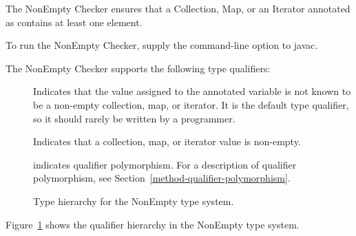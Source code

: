 \htmlhr
{}

The NonEmpty Checker ensures that a Collection, Map, or an Iterator annotated as
 contains at least one element.

To run the NonEmpty Checker, supply the
command-line option to javac.

The NonEmpty Checker supports the following type qualifiers:
\begin{description}

    \item[]
    Indicates that the value assigned to the annotated variable is not known to be a non-empty
    collection, map, or iterator. It is the default type
    qualifier, so it should rarely be written by a programmer.

    \item[]
    Indicates that a collection, map, or iterator value is non-empty.

    \item[]
    indicates qualifier polymorphism.
    For a description of qualifier polymorphism, see
    Section~\ref{method-qualifier-polymorphism}.

\end{description}

\begin{figure}
    \caption{Type hierarchy for the NonEmpty type system.}
    \label{fig-nonempty-hierarchy}
\end{figure}

Figure~\ref{fig-nonempty-hierarchy} shows the qualifier hierarchy in the NonEmpty type system.
